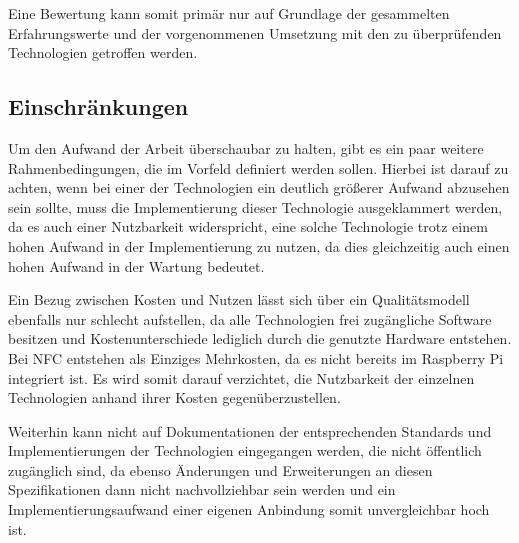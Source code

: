 		Eine Bewertung kann somit primär nur auf Grundlage der gesammelten Erfahrungswerte und der vorgenommenen Umsetzung mit den zu überprüfenden Technologien getroffen werden. 
		
		\subsection{Einschränkungen}
		Um den Aufwand der Arbeit überschaubar zu halten, gibt es ein paar weitere Rahmenbedingungen, die im Vorfeld definiert werden sollen. Hierbei ist darauf zu achten, wenn bei einer der Technologien ein deutlich größerer Aufwand abzusehen sein sollte, muss die Implementierung dieser Technologie ausgeklammert werden, da es auch einer Nutzbarkeit widerspricht, eine solche Technologie trotz einem hohen Aufwand in der Implementierung zu nutzen, da dies gleichzeitig auch einen hohen Aufwand in der Wartung bedeutet.
		
		Ein Bezug zwischen Kosten und Nutzen lässt sich über ein Qualitätsmodell ebenfalls nur schlecht aufstellen, da alle Technologien frei zugängliche Software besitzen und Kostenunterschiede lediglich durch die genutzte Hardware entstehen. Bei NFC entstehen als Einziges Mehrkosten, da es nicht bereits im Raspberry Pi integriert ist. Es wird somit darauf verzichtet, die Nutzbarkeit der einzelnen Technologien anhand ihrer Kosten gegenüberzustellen.
		
		Weiterhin kann nicht auf Dokumentationen der entsprechenden Standards und Implementierungen der Technologien eingegangen werden, die nicht öffentlich \linebreak zugänglich sind, da ebenso Änderungen und Erweiterungen an diesen Spezifikationen dann nicht nachvollziehbar sein werden und ein Implementierungsaufwand einer eigenen Anbindung somit unvergleichbar hoch ist.
		
		
